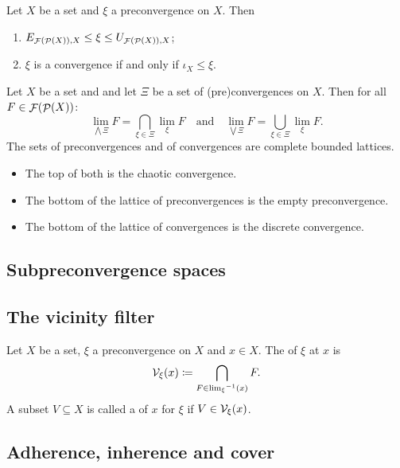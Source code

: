 \begin{lemma}
Let $X$ be a set and $\xi$ a preconvergence on $X$. Then
\begin{enumerate}
\item $E_{\mathop{\mathcal{F}}(\mathop{\mathcal{P}}(X)), X} \leq \xi \leq U_{\mathop{\mathcal{F}}(\mathop{\mathcal{P}}(X)), X}$;
\item $\xi$ is a convergence \textup{if and only if} $\iota_X \leq \xi$.
\end{enumerate}
\end{lemma}

\begin{proposition} \label{latticeConvergences}
Let $X$ be a set and and let $\Xi$ be a set of (pre)convergences on $X$. Then for all $F \in \mathop{\mathcal{F}}(\mathop{\mathcal{P}}(X))$:
\[ \lim_{\bigwedge \Xi} F = \bigcap_{\xi\in\Xi}\lim_\xi F \quad\text{and}\quad \lim_{\bigvee \Xi} F = \bigcup_{\xi\in\Xi}\lim_\xi F. \]
The sets of preconvergences and of convergences are complete bounded lattices.
\begin{itemize}
\item The top of both is the chaotic convergence.
\item The bottom of the lattice of preconvergences is the empty preconvergence.
\item The bottom of the lattice of convergences is the discrete convergence.
\end{itemize}
\end{proposition}


\subsection{Subpreconvergence spaces}

\subsection{The vicinity filter}
\begin{definition}
Let $X$ be a set, $\xi$ a preconvergence on $X$ and $x\in X$. The  of $\xi$ at $x$ is
\[ \mathcal{V}_\xi(x) \coloneqq \bigcap_{F\in {\lim_\xi}^{-1}(x)} F. \]
A subset $V\subseteq X$ is called a  of $x$ for $\xi$ if $V\in \mathcal{V}_\xi(x)$.
\end{definition}

\subsection{Adherence, inherence and cover}
